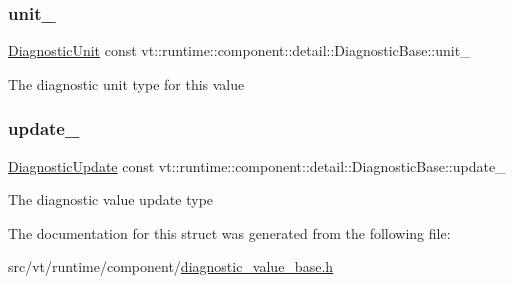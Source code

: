 \subsubsection{\texorpdfstring{unit\+\_\+}{unit\_}}
{\footnotesize\ttfamily \hyperlink{namespacevt_1_1runtime_1_1component_a99ec18b08862c712176126bb7d0e307a}{Diagnostic\+Unit} const vt\+::runtime\+::component\+::detail\+::\+Diagnostic\+Base\+::unit\+\_\+\hspace{0.3cm}{\ttfamily [protected]}}

The diagnostic unit type for this value \mbox{\label{structvt_1_1runtime_1_1component_1_1detail_1_1_diagnostic_base_ad3cde52b9fbd10f4c5de29ce2d4878f3}} 
\subsubsection{\texorpdfstring{update\+\_\+}{update\_}}
{\footnotesize\ttfamily \hyperlink{namespacevt_1_1runtime_1_1component_a896637e6e183a909a17bfd8d3943c206}{Diagnostic\+Update} const vt\+::runtime\+::component\+::detail\+::\+Diagnostic\+Base\+::update\+\_\+\hspace{0.3cm}{\ttfamily [protected]}}

The diagnostic value update type 

The documentation for this struct was generated from the following file\+:\begin{DoxyCompactItemize}
\item 
src/vt/runtime/component/\hyperlink{diagnostic__value__base_8h}{diagnostic\+\_\+value\+\_\+base.\+h}\end{DoxyCompactItemize}
